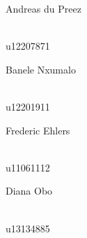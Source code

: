 \begin{titlepage}
\begin{center}
		
		\begin{minipage}{0.4\textwidth}
			\begin{flushleft} \large
				Andreas {du Preez}
			\end{flushleft}
		\end{minipage}
		\begin{minipage}{0.4\textwidth}
			\begin{flushright} \large
				\emph{} \\
				u12207871 
			\end{flushright}
		\end{minipage}
		
		
		\begin{minipage}{0.4\textwidth}
			\begin{flushleft} \large
				Banele {Nxumalo}
			\end{flushleft}
		\end{minipage}
		\begin{minipage}{0.4\textwidth}
			\begin{flushright} \large
				\emph{} \\
				u12201911 
			\end{flushright}
		\end{minipage}
		
		
		\begin{minipage}{0.4\textwidth}
			\begin{flushleft} \large
				Frederic {Ehlers}
			\end{flushleft}
		\end{minipage}
		\begin{minipage}{0.4\textwidth}
			\begin{flushright} \large
				\emph{} \\
				u11061112  
			\end{flushright}
		\end{minipage}
		
		
		\begin{minipage}{0.4\textwidth}
			\begin{flushleft} \large
				Diana {Obo}
			\end{flushleft}
		\end{minipage}
		\begin{minipage}{0.4\textwidth}
			\begin{flushright} \large
				\emph{} \\
				u13134885
			\end{flushright}
		\end{minipage}
		

\end{center}
\end{titlepage}

